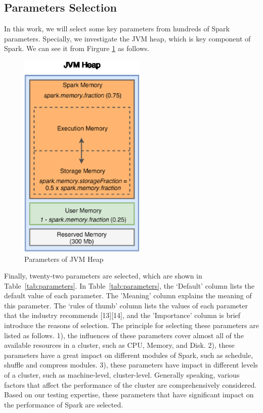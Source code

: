 \subsection{Parameters Selection}\label{subsec:parameters}
\par In this work, we will select some key parameters from hundreds of Spark parameters. Specially, we investigate the JVM heap, which is key component of Spark. We can see it from Firgure \ref{fig:ParametersJVM} as follows.
\begin{figure}
	\centering
	\includegraphics[height=10cm]{3.eps}
	\caption{Parameters of JVM Heap}\label{fig:ParametersJVM}
\end{figure}
 \par Finally, twenty-two parameters are selected, which are shown in Table~\ref{tab:parameters}.  In Table~\ref{tab:parameters}, the ‘Default’ column lists the default value of each parameter. The 'Meaning' column  explains the meaning of this parameter. The ‘rules of thumb’ column lists the values of each parameter that the industry recommends [13][14], and the 'Importance' column is brief introduce the reasons of selection.  The principle for selecting these parameters are listed as follows. 1), the influences of these parameters cover almost all of the available resources in a cluster, such as CPU, Memory, and Disk. 2), these parameters have a great impact on different modules of Spark, such as schedule, shuffle and compress modules. 3), these parameters have impact in different levels of a cluster, such as machine-level, cluster-level. Generally speaking, various factors that affect the performance of the cluster are comprehensively considered. Based on our testing expertise, these parameters that have significant impact on the performance of Spark are selected.

